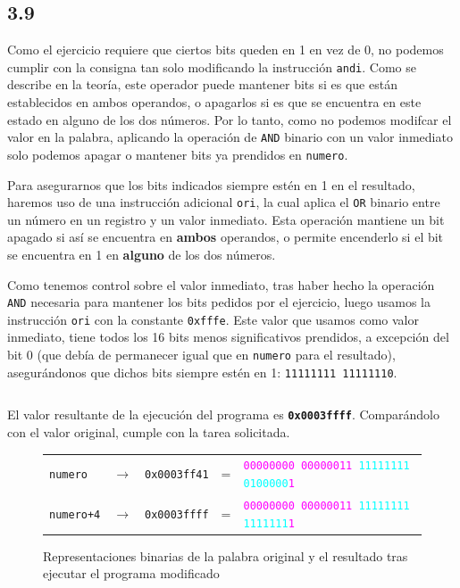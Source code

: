 \documentclass[a4paper]{report}
\begin{document}
\subsection*{3.9}

Como el ejercicio requiere que ciertos bits queden en 1 en vez de 0, no podemos cumplir con la consigna tan solo modificando la instrucción \texttt{andi}. Como se describe en la teoría, este operador puede mantener bits si es que están establecidos en ambos operandos, o apagarlos si es que se encuentra en este estado en alguno de los dos números. Por lo tanto, como no podemos modifcar el valor en la palabra, aplicando la operación de \texttt{AND} binario con un valor inmediato solo podemos apagar o mantener bits ya prendidos en \texttt{numero}.

Para asegurarnos que los bits indicados siempre estén en 1 en el resultado, haremos uso de una instrucción adicional \texttt{ori}, la cual aplica el \texttt{OR} binario entre un número en un registro y un valor inmediato. Esta operación mantiene un bit apagado si así se encuentra en \textbf{ambos} operandos, o permite encenderlo si el bit se encuentra en 1 en \textbf{alguno} de los dos números.

Como tenemos control sobre el valor inmediato, tras haber hecho la operación \texttt{AND} necesaria para mantener los bits pedidos por el ejercicio, luego usamos la instrucción \texttt{ori} con la constante \texttt{0xfffe}. Este valor que usamos como valor inmediato, tiene todos los 16 bits menos significativos prendidos, a excepción del bit 0 (que debía de permanecer igual que en \texttt{numero} para el resultado), asegurándonos que dichos bits siempre estén en 1: \texttt{11111111 11111110}.

\vspace{7pt}
\inputminted[linenos]{mips}{src/cuestiones/c3-9.asm}
\vspace{7pt}

El valor resultante de la ejecución del programa es \textbf{\texttt{0x0003ffff}}. Comparándolo con el valor original, cumple con la tarea solicitada.

\begin{figure}[H]
    \centering
    \captionsetup{justification = centering}
    \begin{tabular}{l l r c l}
        \texttt{numero} & $\rightarrow$ & \texttt{0x0003ff41} &=& \texttt{\textcolor{magenta}{00000000 00000011} \textcolor{cyan}{11111111 0100000}\textcolor{magenta}{1}} \\
        \texttt{numero+4} & $\rightarrow$ & \texttt{0x0003ffff} &=& \texttt{\textcolor{magenta}{00000000 00000011} \textcolor{cyan}{11111111 1111111}\textcolor{magenta}{1}}
    \end{tabular}

    \caption{Representaciones binarias de la palabra original y el resultado tras ejecutar el programa modificado}
    \label{fig:bin-3-9}
\end{figure}
\end{document}
